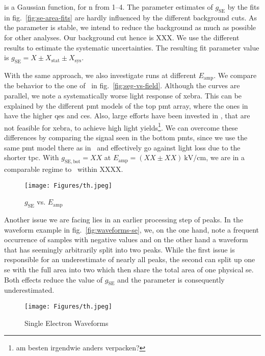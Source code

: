 is a Gaussian function, for n from \numrange{1}{4}.
The parameter estimates of $ g_\mathrm{SE} $ by the fits in fig.~\ref{fig:se-area-fits} are hardly influenced by the different background cuts.
As the parameter is stable, we intend to reduce the background as much as possible for other analyses.
Our background cut hence is XXX.  %
We use the different results to estimate the systematic uncertainties.
The resulting fit parameter value is $ g_\mathrm{SE} = X \pm X_\mathrm{stat} \pm X_\mathrm{sys} $.  %


With the same approach, we also investigate runs at different $ E_\mathrm{amp} $.
We compare the behavior to the one of \oneton~in fig.~\ref{fig:seg-vs-field}.
Although the curves are parallel, we note a systematically worse light response of \gls{xebra}.
This can be explained by the different \gls{pmt} models of the top \gls{pmt} array, where the ones in \oneton have the higher \glspl{qe} and \glspl{ce}.
Also, large efforts have been invested in \oneton, that are not feasible for \gls{xebra}, to achieve high light yields\footnote{am besten irgendwie anders verpacken?}.
We can overcome these differences by comparing the signal seen in the bottom \glspl{pmt}, since we use the same \gls{pmt} model there as in \oneton~and effectively go against light loss due to the shorter \gls{tpc}.
With $ g_\mathrm{SE, bot} = XX $ at $ E_\mathrm{amp} = \left( XX \pm XX \right) \SI{}{\kilo\volt\per\centi\meter} $, we are in a comparable regime to \oneton~within XXXX.  %


\begin{figure}
    \centering
    \texttt{[image: Figures/th.jpeg]}  %
    \caption[\oneton comparison of Amplification Gain vs. Fieldstrength]{
        $ g_\mathrm{SE} $ vs. $ E_\mathrm{amp} $
    }
\end{figure}
    \label{fig:seg-vs-field}


Another issue we are facing lies in an earlier processing step of peaks.
In the waveform example in fig.~\ref{fig:waveforms-se}, we, on the one hand, note a frequent occurrence of samples with negative values and on the other hand a waveform that has seemingly arbitrarily split into two peaks.
While the first issue is responsible for an underestimate of nearly all peaks, the second can split up one \gls{se} with the full area into two which then share the total area of one physical \gls{se}.
Both effects reduce the value of $ g_\mathrm{SE} $ and the parameter is consequently underestimated.


\begin{figure}
    \centering
    \texttt{[image: Figures/th.jpeg]}  %
    \caption[Single Electrons Waveforms]{
        Single Electron Waveforms
    }
\end{figure}


